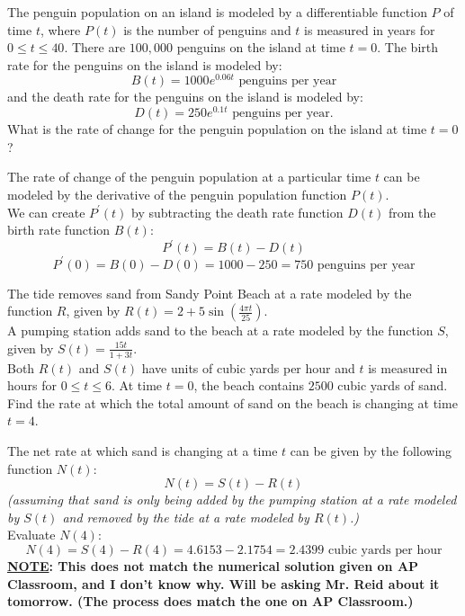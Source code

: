 \documentclass[12pt,letterpaper, onecolumn]{exam}
\begin{document}
\begin{questions}
\pagebreak

\question
The penguin population on an island is modeled by a differentiable function $P$ of time $t$, where $P(t)$ is the number of penguins and $t$ is measured in years for $0 \leq t \leq 40$. There are $100,000$ penguins on the island at time $t = 0$. The birth rate for the penguins on the island is modeled by:
$$B(t) = 1000e^{0.06t} \text{ penguins per year}$$ 
and the death rate for the penguins on the island is modeled by:
$$D(t)=250e^{0.1t} \text{ penguins per year.}$$
What is the rate of change for the penguin population on the island at time $t = 0$?
\begin{solution}
	The rate of change of the penguin population at a particular time $t$ can be modeled by the derivative of the penguin population function $P(t)$. \\
	We can create $P^\prime(t)$ by subtracting the death rate function $D(t)$ from the birth rate function $B(t)$:
	$$P^\prime(t)=B(t)-D(t)$$
	$$P^\prime(0)=B(0)-D(0) = 1000-250 = \boxed{750 \text{ penguins per year}}$$
\end{solution}


\pagebreak

\question
The tide removes sand from Sandy Point Beach at a rate modeled by the function $R$, given by $R(t)=2+5\sin(\frac{4\pi t}{25})$. \\
A pumping station adds sand to the beach at a rate modeled by the function $S$, given by $S(t)=\frac{15t}{1+3t}$. \\
Both $R(t)$ and $S(t)$ have units of cubic yards per hour and $t$ is measured in hours for $0 \leq t \leq 6$. At time $t = 0$, the beach contains $2500$ cubic yards of sand. \\
Find the rate at which the total amount of sand on the beach is changing at time $t = 4$.

\begin{solution}
	The net rate at which sand is changing at a time $t$ can be given by the following function $N(t)$:
	$$N(t)=S(t)-R(t)$$
	\emph{(assuming that sand is only being added by the pumping station at a rate modeled by $S(t)$ and removed by the tide at a rate modeled by $R(t)$.)} \\
	Evaluate $N(4)$:
	$$N(4)=S(4)-R(4)=4.6153-2.1754=\boxed{2.4399 \text{ cubic yards per hour}}$$
	{\textbf{\color{red} {\large \underline{NOTE}}: This does not match the numerical solution given on AP Classroom, and I don't know why. Will be asking Mr. Reid about it tomorrow. (The process does match the one on AP Classroom.)}}
\end{solution}


\end{questions}
\end{document}
